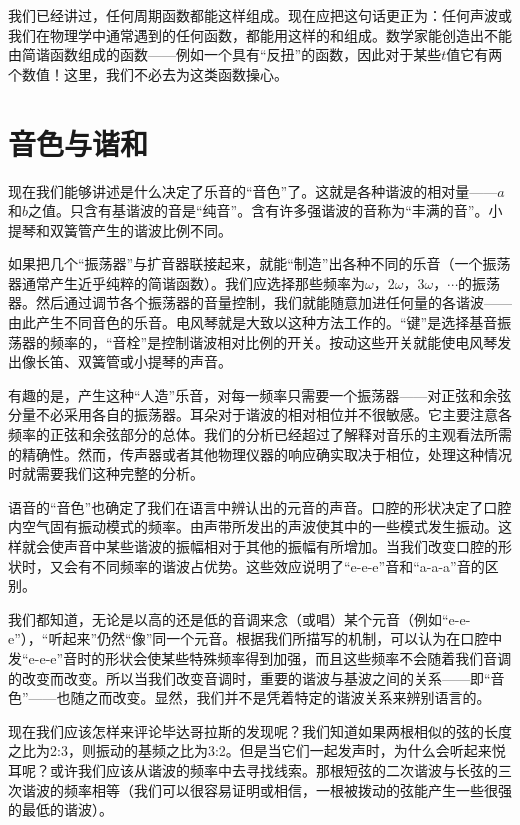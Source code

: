 我们已经讲过，任何周期函数都能这样组成。现在应把这句话更正为：任何声波或我们在物理学中通常遇到的任何函数，都能用这样的和组成。数学家能创造出不能由简谐函数组成的函数——例如一个具有“反扭”的函数，因此对于某些$t$值它有两个数值！这里，我们不必去为这类函数操心。

\section{音色与谐和}

现在我们能够讲述是什么决定了乐音的“音色”了。这就是各种谐波的相对量——$a$和$b$之值。只含有基谐波的音是“纯音”。含有许多强谐波的音称为“丰满的音”。小提琴和双簧管产生的谐波比例不同。

如果把几个“振荡器”与扩音器联接起来，就能“制造”出各种不同的乐音（一个振荡器通常产生近乎纯粹的简谐函数）。我们应选择那些频率为$\omega$，$2\omega$，$3\omega$，$\cdots$的振荡器。然后通过调节各个振荡器的音量控制，我们就能随意加进任何量的各谐波——由此产生不同音色的乐音。电风琴就是大致以这种方法工作的。“键”是选择基音振荡器的频率的，“音栓”是控制谐波相对比例的开关。按动这些开关就能使电风琴发出像长笛、双簧管或小提琴的声音。

有趣的是，产生这种“人造”乐音，对每一频率只需要一个振荡器——对正弦和余弦分量不必采用各自的振荡器。耳朵对于谐波的相对相位并不很敏感。它主要注意各频率的正弦和余弦部分的总体。我们的分析已经超过了解释对音乐的主观看法所需的精确性。然而，传声器或者其他物理仪器的响应确实取决于相位，处理这种情况时就需要我们这种完整的分析。

语音的“音色”也确定了我们在语言中辨认出的元音的声音。口腔的形状决定了口腔内空气固有振动模式的频率。由声带所发出的声波使其中的一些模式发生振动。这样就会使声音中某些谐波的振幅相对于其他的振幅有所增加。当我们改变口腔的形状时，又会有不同频率的谐波占优势。这些效应说明了“e-e-e”音和“a-a-a”音的区别。

我们都知道，无论是以高的还是低的音调来念（或唱）某个元音（例如“e-e-e”），“听起来”仍然“像”同一个元音。根据我们所描写的机制，可以认为在口腔中发“e-e-e”音时的形状会使某些特殊频率得到加强，而且这些频率不会随着我们音调的改变而改变。所以当我们改变音调时，重要的谐波与基波之间的关系——即“音色”——也随之而改变。显然，我们并不是凭着特定的谐波关系来辨别语言的。

现在我们应该怎样来评论毕达哥拉斯的发现呢？我们知道如果两根相似的弦的长度之比为2:3，则振动的基频之比为3:2。但是当它们一起发声时，为什么会听起来悦耳呢？或许我们应该从谐波的频率中去寻找线索。那根短弦的二次谐波与长弦的三次谐波的频率相等（我们可以很容易证明或相信，一根被拨动的弦能产生一些很强的最低的谐波）。

